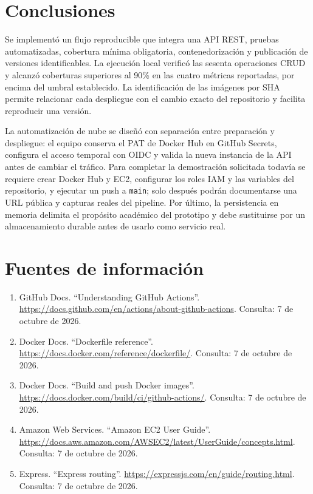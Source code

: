 \documentclass[12pt,letterpaper]{article}
\begin{document}
\section{Conclusiones}
Se implementó un flujo reproducible que integra una API REST, pruebas automatizadas, cobertura mínima obligatoria, contenedorización y publicación de versiones identificables. La ejecución local verificó las sesenta operaciones CRUD y alcanzó coberturas superiores al 90\% en las cuatro métricas reportadas, por encima del umbral establecido. La identificación de las imágenes por SHA permite relacionar cada despliegue con el cambio exacto del repositorio y facilita reproducir una versión.

La automatización de nube se diseñó con separación entre preparación y despliegue: el equipo conserva el PAT de Docker Hub en GitHub Secrets, configura el acceso temporal con OIDC y valida la nueva instancia de la API antes de cambiar el tráfico. Para completar la demostración solicitada todavía se requiere crear Docker Hub y EC2, configurar los roles IAM y las variables del repositorio, y ejecutar un push a \texttt{main}; solo después podrán documentarse una URL pública y capturas reales del pipeline. Por último, la persistencia en memoria delimita el propósito académico del prototipo y debe sustituirse por un almacenamiento durable antes de usarlo como servicio real.

\section{Fuentes de información}
\begin{enumerate}
  \item GitHub Docs. ``Understanding GitHub Actions''. \url{https://docs.github.com/en/actions/about-github-actions}. Consulta: 7 de octubre de 2026.
  \item Docker Docs. ``Dockerfile reference''. \url{https://docs.docker.com/reference/dockerfile/}. Consulta: 7 de octubre de 2026.
  \item Docker Docs. ``Build and push Docker images''. \url{https://docs.docker.com/build/ci/github-actions/}. Consulta: 7 de octubre de 2026.
  \item Amazon Web Services. ``Amazon EC2 User Guide''. \url{https://docs.aws.amazon.com/AWSEC2/latest/UserGuide/concepts.html}. Consulta: 7 de octubre de 2026.
  \item Express. ``Express routing''. \url{https://expressjs.com/en/guide/routing.html}. Consulta: 7 de octubre de 2026.
\end{enumerate}
\end{document}
